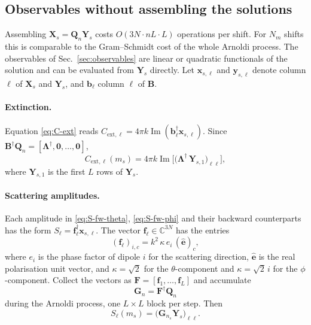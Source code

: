 \documentclass[11pt,a4paper]{article}
\begin{document}
\subsection{Observables without assembling the solutions}
\label{sec:shift-observables}

Assembling $\mathbf{X}_s = \mathbf{Q}_n \mathbf{Y}_s$ costs
$O(3N \cdot nL \cdot L)$ operations per shift.
For $N_m$ shifts this is comparable to the Gram--Schmidt cost of the
whole Arnoldi process.
The observables of Sec.~\ref{sec:observables} are linear or quadratic
functionals of the solution and can be evaluated from
$\mathbf{Y}_s$ directly.
Let $\bm{x}_{s,\ell}$ and $\bm{y}_{s,\ell}$ denote column $\ell$ of
$\mathbf{X}_s$ and $\mathbf{Y}_s$, and $\bm{b}_\ell$ column $\ell$ of
$\mathbf{B}$.

\paragraph{Extinction.}
Equation \eqref{eq:C-ext} reads
$C_{\text{ext},\ell} = 4\pi k \operatorname{Im}(\bm{b}_\ell^\dagger \bm{x}_{s,\ell})$.
Since
$\mathbf{B}^\dagger \mathbf{Q}_n
  = [\boldsymbol{\Lambda}^\dagger, \mathbf{0}, \ldots, \mathbf{0}]$,
\begin{equation}
  C_{\text{ext},\ell}(m_s)
    = 4\pi k \operatorname{Im}
      \bigl[ \bigl( \boldsymbol{\Lambda}^\dagger\,
             \mathbf{Y}_{s,1} \bigr)_{\ell\ell} \bigr],
  \label{eq:C-ext-shifted}
\end{equation}
where $\mathbf{Y}_{s,1}$ is the first $L$ rows of $\mathbf{Y}_s$.

\paragraph{Scattering amplitudes.}
Each amplitude in \eqref{eq:S-fw-theta}, \eqref{eq:S-fw-phi} and their
backward counterparts has the form
$S_\ell = \bm{f}_\ell^\dagger \bm{x}_{s,\ell}$.
The vector $\bm{f}_\ell \in \mathbb{C}^{3N}$ has the entries
\begin{equation}
  (\bm{f}_\ell)_{i,c} = k^2\, \kappa\, e_i\, (\hat{\bm{e}})_c ,
  \label{eq:functional-f}
\end{equation}
where $e_i$ is the phase factor of dipole $i$ for the scattering
direction, $\hat{\bm{e}}$ is the real polarisation unit vector, and
$\kappa = \sqrt{2}$ for the $\theta$-component and
$\kappa = \sqrt{2}\,i$ for the $\phi$-component.
Collect the vectors as
$\mathbf{F} = [\bm{f}_1, \ldots, \bm{f}_L]$ and accumulate
\begin{equation}
  \mathbf{G}_n = \mathbf{F}^\dagger \mathbf{Q}_n
  \label{eq:projection-G}
\end{equation}
during the Arnoldi process, one $L \times L$ block per step.
Then
\begin{equation}
  S_\ell(m_s) = \bigl( \mathbf{G}_{n_s} \mathbf{Y}_s \bigr)_{\ell\ell} .
  \label{eq:S-shifted}
\end{equation}
\end{document}
